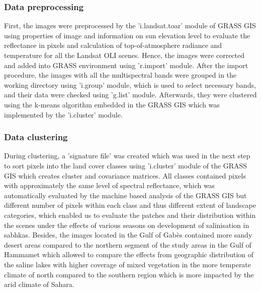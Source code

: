 \documentclass[environments,article,submit,pdftex,moreauthors]{Definitions/mdpi}
\begin{document}
\subsubsection{Data preprocessing}
First, the images were preprocessed by the 'i.landsat.toar' module of GRASS GIS using properties of image and information on sun elevation level to evaluate the reflectance in pixels and calculation of top-of-atmosphere radiance and temperature for all the Landsat OLI scenes. Hence, the images were corrected and added into GRASS environment using 'r.import' module. After the import procedure, the images with all the multispectral bands were grouped in the working directory using 'i.group' module, which is used to select necessary bands, and their data were checked using 'g.list' module. Afterwards, they were clustered using the k-means algorithm embedded in the GRASS GIS which was implemented by the 'i.cluster' module. 

\subsubsection{Data clustering}

During clustering, a 'signature file' was created which was used in the next step to sort pixels into the land cover classes using 'i.cluster' module of the GRASS GIS which creates cluster and covariance matrices. All classes contained pixels with approximately the same level of spectral reflectance, which was automatically evaluated by the machine based analysis of the GRASS GIS but different number of pixels within each class and thus different extent of landscape categories, which enabled us to evaluate the patches and their distribution within the scenes under the effects of various seasons on development of salinisation in sabhkas. Besides, the images located in the Gulf of Gabès contained more sandy desert areas compared to the northern segment of the study areas in the Gulf of Hammamet which allowed to compare the effects from geographic distribution of the saline lakes with higher coverage of mixed vegetation in the more temperate climate of north compared to the southern region which is more impacted by the arid climate of Sahara.
\end{document}
